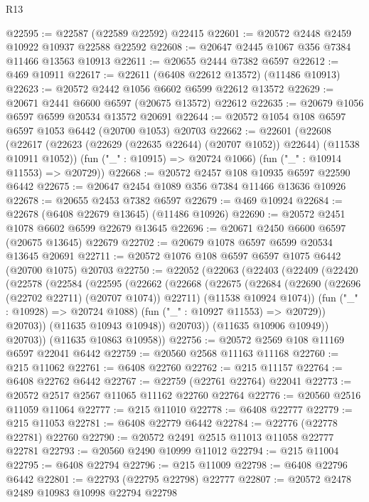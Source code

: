 \begin{lexlean}{R13}
\begin{coremodule}
@22595 := @22587 (@22589 @22592) @22415
@22601 := @20572 @2448 @2459 @10922 @10937 @22588 @22592
@22608 := @20647 @2445 @1067 @356 @7384 @11466 @13563 @10913
@22611 := @20655 @2444 @7382 @6597
@22612 := @469 @10911
@22617 := @22611 (@6408 @22612 @13572) (@11486 @10913)
@22623 := @20572 @2442 @1056 @6602 @6599 @22612 @13572
@22629 := @20671 @2441 @6600 @6597 (@20675 @13572) @22612
@22635 := @20679 @1056 @6597 @6599 @20534 @13572 @20691
@22644 := @20572 @1054 @108 @6597 @6597 @1053 @6442 (@20700 @1053) @20703
@22662 := @22601
    (@22608
      (@22617 (@22623 (@22629 (@22635 @22644) (@20707 @1052)) @22644) (@11538 @10911 @1052))
      (fun ("_" : @10915) => @20724 @1066)
      (fun ("_" : @10914 @11553) => @20729))
@22668 := @20572 @2457 @108 @10935 @6597 @22590 @6442
@22675 := @20647 @2454 @1089 @356 @7384 @11466 @13636 @10926
@22678 := @20655 @2453 @7382 @6597
@22679 := @469 @10924
@22684 := @22678 (@6408 @22679 @13645) (@11486 @10926)
@22690 := @20572 @2451 @1078 @6602 @6599 @22679 @13645
@22696 := @20671 @2450 @6600 @6597 (@20675 @13645) @22679
@22702 := @20679 @1078 @6597 @6599 @20534 @13645 @20691
@22711 := @20572 @1076 @108 @6597 @6597 @1075 @6442 (@20700 @1075) @20703
@22750 := @22052
    (@22063
      (@22403
        (@22409
          (@22420
            (@22578
              (@22584
                (@22595
                  (@22662
                    (@22668
                      (@22675
                        (@22684
                          (@22690 (@22696 (@22702 @22711) (@20707 @1074)) @22711)
                          (@11538 @10924 @1074))
                        (fun ("_" : @10928) => @20724 @1088)
                        (fun ("_" : @10927 @11553) => @20729))
                      @20703))
                  (@11635 @10943 @10948))
                @20703))
            (@11635 @10906 @10949))
          @20703))
      (@11635 @10863 @10958))
@22756 := @20572 @2569 @108 @11169 @6597 @22041 @6442
@22759 := @20560 @2568 @11163 @11168
@22760 := @215 @11062
@22761 := @6408 @22760
@22762 := @215 @11157
@22764 := @6408 @22762 @6442
@22767 := @22759 (@22761 @22764) @22041
@22773 := @20572 @2517 @2567 @11065 @11162 @22760 @22764
@22776 := @20560 @2516 @11059 @11064
@22777 := @215 @11010
@22778 := @6408 @22777
@22779 := @215 @11053
@22781 := @6408 @22779 @6442
@22784 := @22776 (@22778 @22781) @22760
@22790 := @20572 @2491 @2515 @11013 @11058 @22777 @22781
@22793 := @20560 @2490 @10999 @11012
@22794 := @215 @11004
@22795 := @6408 @22794
@22796 := @215 @11009
@22798 := @6408 @22796 @6442
@22801 := @22793 (@22795 @22798) @22777
@22807 := @20572 @2478 @2489 @10983 @10998 @22794 @22798

\end{coremodule}
\end{lexlean}
